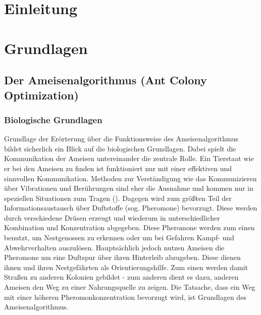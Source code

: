 \documentclass[doktyp=barbeit, sprache=german]{TUBAFarbeiten}
\begin{document}
\maketitle
\tableofcontents
\newpage
\section{Einleitung}
\section{Grundlagen}
\subsection{Der Ameisenalgorithmus (Ant Colony Optimization)}
\subsubsection{Biologische Grundlagen}
Grundlage der Erörterung über die Funktionsweise des Ameisenalgorithmus bildet sicherlich ein Blick auf die biologischen Grundlagen. Dabei spielt die Kommunikation der Ameisen untereinander die zentrale Rolle. Ein Tierstaat wie er bei den Ameisen zu finden ist funktioniert nur mit einer effektiven und sinnvollen Kommunikation. Methoden zur Verständigung wie das Kommunizieren über Vibrationen und Berührungen sind eher die Ausnahme und kommen nur in speziellen Situationen zum Tragen (\cite{Ameisen}). Dagegen wird zum größten Teil der Informationsaustausch über Duftstoffe (sog. Pheromone) bevorzugt. Diese werden durch verschiedene Drüsen erzeugt und wiederum in unterschiedlicher Kombination und Konzentration abgegeben.
Diese Pheromone werden zum einen benutzt, um Nestgenossen zu erkennen oder um bei Gefahren Kampf- und Abwehrverhalten auszulösen. Hauptsächlich jedoch nutzen Ameisen die Pheromone um eine Duftspur über ihren Hinterleib abzugeben. Diese dienen ihnen und ihren Nestgefährten als Orientierungshilfe. Zum einen werden damit Straßen zu anderen Kolonien gebildet - zum anderen dient es dazu, anderen Ameisen den Weg zu einer Nahrungsquelle zu zeigen. Die Tatsache, dass ein Weg mit einer höheren Pheromonkonzentration bevorzugt wird, ist Grundlagen des Ameisenalgorithmus.
\end{document}
